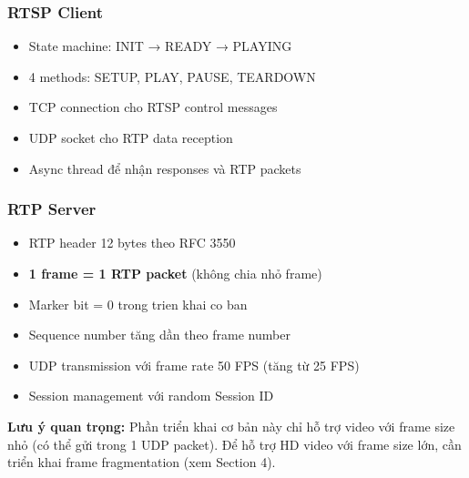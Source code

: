 \subsubsection{RTSP Client}
\begin{itemize}
    \item State machine: INIT → READY → PLAYING
    \item 4 methods: SETUP, PLAY, PAUSE, TEARDOWN
    \item TCP connection cho RTSP control messages
    \item UDP socket cho RTP data reception
    \item Async thread để nhận responses và RTP packets
\end{itemize}

\subsubsection{RTP Server}
\begin{itemize}
    \item RTP header 12 bytes theo RFC 3550
    \item \textbf{1 frame = 1 RTP packet} (không chia nhỏ frame)
    \item Marker bit = 0 trong trien khai co ban
    \item Sequence number tăng dần theo frame number
    \item UDP transmission với frame rate 50 FPS (tăng từ 25 FPS)
    \item Session management với random Session ID
\end{itemize}

\textbf{Lưu ý quan trọng:} Phần triển khai cơ bản này chỉ hỗ trợ video với frame size nhỏ (có thể gửi trong 1 UDP packet). Để hỗ trợ HD video với frame size lớn, cần triển khai frame fragmentation (xem Section 4).

\clearpage
